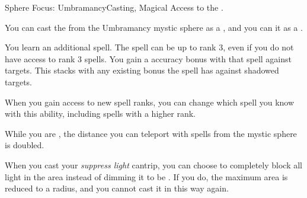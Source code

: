     \begin{magicalfeat}{Sphere Focus: Umbramancy}{Casting, Magical}
        \featpre Access to the  .

         You can cast the   from the Umbramancy mystic sphere as a , and you can  it as a .

         You learn an additional spell.
        The spell can be up to rank 3, even if you do not have access to rank 3 spells.
        You gain a  accuracy bonus with that spell against  targets.
        This stacks with any existing bonus the spell has against shadowed targets.

        When you gain access to new spell ranks, you can change which spell you know with this ability, including spells with a higher rank.

         While you are , the distance you can teleport with spells from the  mystic sphere is doubled.

         When you cast your \textit{suppress light} cantrip, you can choose to completely block all light in the area instead of dimming it to be .
        If you do, the maximum area is reduced to a \medarea radius, and you  cannot cast it in this way again.
    \end{magicalfeat}

